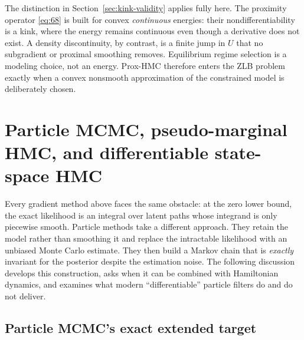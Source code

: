 \documentclass[11pt]{article}
\begin{document}
The distinction in Section~\ref{sec:kink-validity} applies fully here. The proximity operator \eqref{eq:68} is built for convex \emph{continuous} energies: their nondifferentiability is a kink, where the energy remains continuous even though a derivative does not exist. A density discontinuity, by contrast, is a finite jump in $U$ that no subgradient or proximal smoothing removes. Equilibrium regime selection is a modeling choice, not an energy. Prox-HMC therefore enters the ZLB problem exactly when a convex nonsmooth approximation of the constrained model is deliberately chosen.

\section{Particle MCMC, pseudo-marginal HMC, and differentiable state-space HMC}\label{sec:pmcmc}

Every gradient method above faces the same obstacle: at the zero lower bound, the exact likelihood is an integral over latent paths whose integrand is only piecewise smooth. Particle methods take a different approach. They retain the model rather than smoothing it and replace the intractable likelihood with an unbiased Monte Carlo estimate. They then build a Markov chain that is \emph{exactly} invariant for the posterior despite the estimation noise. The following discussion develops this construction, asks when it can be combined with Hamiltonian dynamics, and examines what modern ``differentiable'' particle filters do and do not deliver.

\subsection{Particle MCMC's exact extended target}\label{sec:pm-target}
\end{document}
